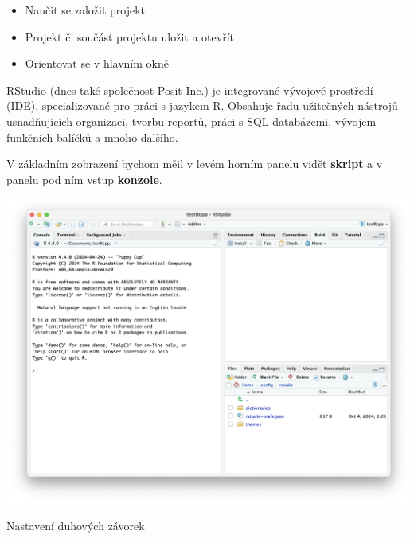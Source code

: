 \documentclass[
  letterpaper,
  DIV=11,
  numbers=noendperiod]{scrreprt}
\providecommand{\tightlist}{%
  \setlength{\itemsep}{0pt}\setlength{\parskip}{0pt}}\usepackage{longtable,booktabs,array}
\begin{document}
\begin{tcolorbox}[enhanced jigsaw, toprule=.15mm, breakable, title=\textcolor{quarto-callout-warning-color}{\faExclamationTriangle}\hspace{0.5em}{Cíle cvičení}, colframe=quarto-callout-warning-color-frame, bottomrule=.15mm, left=2mm, leftrule=.75mm, colbacktitle=quarto-callout-warning-color!10!white, colback=white, bottomtitle=1mm, toptitle=1mm, opacityback=0, opacitybacktitle=0.6, arc=.35mm, coltitle=black, rightrule=.15mm, titlerule=0mm]

\begin{itemize}
\tightlist
\item
  Naučit se založit projekt
\item
  Projekt či součást projektu uložit a otevřít
\item
  Orientovat se v hlavním okně
\end{itemize}

\end{tcolorbox}

RStudio (dnes také společnost Posit Inc.) je integrované vývojové
prostředí (IDE), specializované pro práci s jazykem R. Obsahuje řadu
užitečných nástrojů usnadňujících organizaci, tvorbu reportů, práci s
SQL databázemi, vývojem funkčních balíčků a mnoho dalšího.

V základním zobrazení bychom měil v levém horním panelu vidět
\textbf{skript} a v panelu pod ním vstup \textbf{konzole}.

\includegraphics[width=1\textwidth,height=\textheight]{images/main.png}

Nastavení duhových závorek
\end{document}
